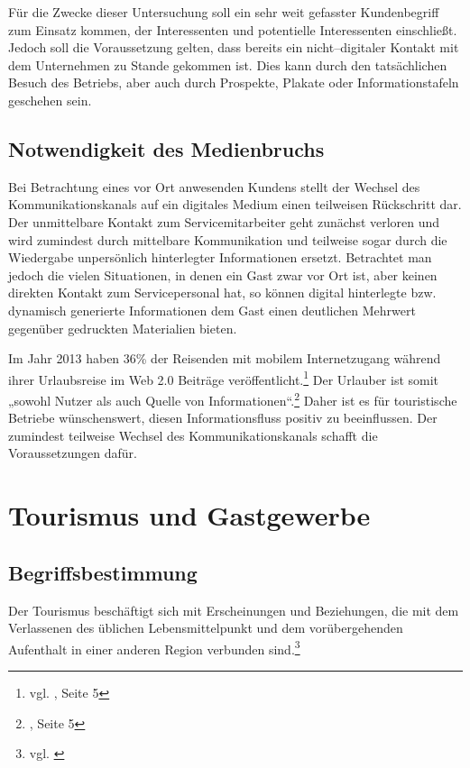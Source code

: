 Für die Zwecke dieser Untersuchung soll ein sehr weit gefasster Kundenbegriff zum Einsatz kommen, der Interessenten und potentielle Interessenten einschließt. Jedoch soll die Voraussetzung gelten, dass bereits ein nicht--digitaler Kontakt mit dem Unternehmen zu Stande gekommen ist. Dies kann durch den tatsächlichen Besuch des Betriebs, aber auch durch Prospekte, Plakate oder Informationstafeln geschehen sein.

\subsection{Notwendigkeit des Medienbruchs} %
\label{sec:medienbruch}

Bei Betrachtung eines vor Ort anwesenden Kundens stellt der Wechsel des Kommunikationskanals auf ein digitales Medium einen teilweisen Rückschritt dar. Der unmittelbare Kontakt zum Servicemitarbeiter geht zunächst verloren und wird zumindest durch mittelbare Kommunikation und teilweise sogar durch die Wiedergabe unpersönlich hinterlegter Informationen ersetzt.
Betrachtet man jedoch die vielen Situationen, in denen ein Gast zwar vor Ort ist, aber keinen direkten Kontakt zum Servicepersonal hat, so können digital hinterlegte bzw. dynamisch generierte Informationen dem Gast einen deutlichen Mehrwert gegenüber gedruckten Materialien bieten.

Im Jahr 2013 haben 36\% der Reisenden mit mobilem Internetzugang während ihrer Urlaubsreise im Web 2.0 Beiträge veröffentlicht.\footnote{vgl. \cite{reiseanalyse}, Seite 5} Der Urlauber ist somit „sowohl Nutzer als auch Quelle von Informationen“.\footnote{\cite{reiseanalyse}, Seite 5} Daher ist es für touristische Betriebe wünschenswert, diesen Informationsfluss positiv zu beeinflussen. Der zumindest teilweise Wechsel des Kommunikationskanals schafft die Voraussetzungen dafür.

\newpage
\section{Tourismus und Gastgewerbe} %
\label{sec:tourismusbranche}

\subsection{Begriffsbestimmung} %
\label{sub:begriffsbestimmung}
Der Tourismus beschäftigt sich mit Erscheinungen und Beziehungen, die mit dem Verlassenen des üblichen Lebensmittelpunkt und dem vorübergehenden Aufenthalt in einer anderen Region verbunden sind.\footnote{vgl. \cite{gabler:tourismus}}

